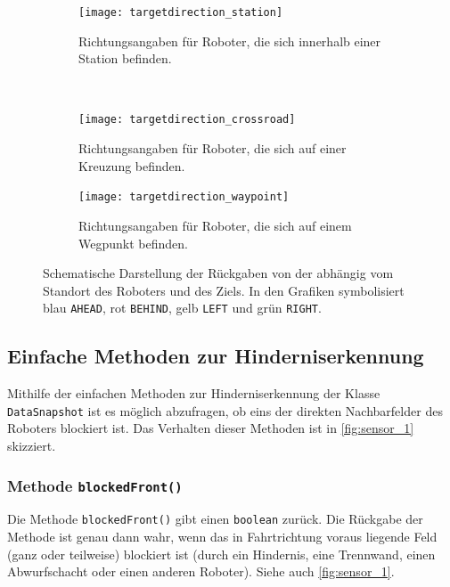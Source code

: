 \begin{figure}[h]
	\centering
	\begin{subfigure}[b]{0.3\textwidth}
		\centering
		\texttt{[image: targetdirection\_station]}
		\caption{Richtungsangaben für Roboter, die sich innerhalb einer Station befinden.}
		\label{fig:targetdirection_1}
	\end{subfigure}
	~~~~~
	\begin{subfigure}[b]{0.6\textwidth}
		\centering
		\texttt{[image: targetdirection\_crossroad]}
		\caption{Richtungsangaben für Roboter, die sich auf einer Kreuzung befinden.}
		\label{fig:targetdirection_2}
	\end{subfigure}
	\begin{subfigure}[b]{1\textwidth}
		\centering
		\vspace{1cm}
		\texttt{[image: targetdirection\_waypoint]}
		\caption{Richtungsangaben für Roboter, die sich auf einem Wegpunkt befinden.}
		\label{fig:targetdirection_3}
	\end{subfigure}
	\caption{Schematische Darstellung der Rückgaben von der  abhängig vom Standort des Roboters und des Ziels. 
	In den Grafiken symbolisiert blau \texttt{AHEAD}, rot \texttt{BEHIND}, gelb \texttt{LEFT} und grün \texttt{RIGHT}.}
	\label{fig:targetdirection}
\end{figure}

\clearpage

\subsection*{Einfache Methoden zur Hinderniserkennung }

Mithilfe der einfachen Methoden zur Hinderniserkennung der Klasse \texttt{DataSnapshot} ist es möglich abzufragen, ob eins der direkten Nachbarfelder des Roboters blockiert ist. 
Das Verhalten dieser Methoden ist in \autoref{fig:sensor_1} skizziert.

\subsubsection{Methode \texttt{blockedFront()}}

Die Methode \texttt{blockedFront()} gibt einen \texttt{boolean} zurück. 
Die Rückgabe der Methode ist genau dann wahr, wenn das in Fahrtrichtung voraus liegende Feld (ganz oder teilweise) blockiert ist (durch ein Hindernis, eine Trennwand, einen Abwurfschacht oder einen anderen Roboter). 
Siehe auch \autoref{fig:sensor_1}.


